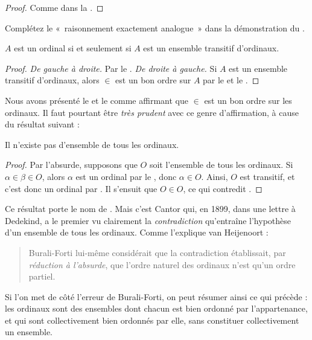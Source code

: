 \documentclass[../../../include/open-logic-section]{subfiles}
\begin{document}
\begin{proof}
Comme dans la .
\end{proof}

\begin{prob}
Complétez le «~raisonnement exactement analogue~» dans la
démonstration du .
\end{prob}

\begin{cor}
$A$ est un ordinal si et seulement si $A$ est un ensemble transitif
d'ordinaux.
\end{cor}

\begin{proof}
\emph{De gauche à droite.} Par le .
\emph{De droite à gauche.} Si $A$ est un ensemble transitif
d'ordinaux, alors $\in$ est un bon ordre sur $A$ par le
 et le .
\end{proof}

Nous avons présenté le  et le
 comme affirmant que $\in$ est un bon ordre sur
les ordinaux. Il faut pourtant être \emph{très prudent} avec ce genre
d'affirmation, à cause du résultat suivant :

\begin{thm}
Il n'existe pas d'ensemble de tous les ordinaux.
\end{thm}

\begin{proof}
Par l'absurde, supposons que $O$ soit l'ensemble de tous les
ordinaux. Si $\alpha \in \beta \in O$, alors $\alpha$ est un ordinal
par le , donc $\alpha \in O$. Ainsi, $O$ est
transitif, et c'est donc un ordinal par .
Il s'ensuit que $O \in O$, ce qui contredit .
\end{proof}
\noindent
Ce résultat porte le nom de \citeauthor{Burali-Forti1897}. Mais c'est
Cantor qui, en 1899, dans une lettre à Dedekind, a le premier vu
clairement la \emph{contradiction} qu'entraîne l'hypothèse d'un
ensemble de tous les ordinaux. Comme l'explique van Heijenoort :
\begin{quote}
  Burali-Forti lui-même considérait que la contradiction établissait,
  par \emph{réduction à l'absurde}, que l'ordre naturel des ordinaux
  n'est qu'un ordre partiel.
  \citep[p.~105]{Heijenoort1967}
\end{quote}
Si l'on met de côté l'erreur de Burali-Forti, on peut résumer ainsi
ce qui précède : les ordinaux sont des ensembles dont chacun est bien
ordonné par l'appartenance, et qui sont collectivement bien ordonnés
par elle, sans constituer collectivement un ensemble.
\end{document}
